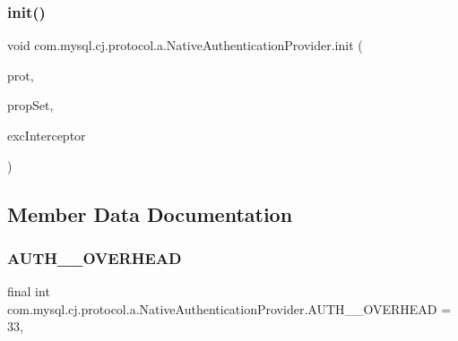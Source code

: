\subsubsection{\texorpdfstring{init()}{init()}}
{\footnotesize\ttfamily void com.\+mysql.\+cj.\+protocol.\+a.\+Native\+Authentication\+Provider.\+init (\begin{DoxyParamCaption}\item[{\mbox{\hyperlink{interfacecom_1_1mysql_1_1cj_1_1protocol_1_1_protocol}{Protocol}}$<$ \mbox{\hyperlink{classcom_1_1mysql_1_1cj_1_1protocol_1_1a_1_1_native_packet_payload}{Native\+Packet\+Payload}} $>$}]{prot,  }\item[{\mbox{\hyperlink{interfacecom_1_1mysql_1_1cj_1_1conf_1_1_property_set}{Property\+Set}}}]{prop\+Set,  }\item[{\mbox{\hyperlink{interfacecom_1_1mysql_1_1cj_1_1exceptions_1_1_exception_interceptor}{Exception\+Interceptor}}}]{exc\+Interceptor }\end{DoxyParamCaption})}



\subsection{Member Data Documentation}
\mbox{\label{classcom_1_1mysql_1_1cj_1_1protocol_1_1a_1_1_native_authentication_provider_a49df77ded491c1f4b77a3f1dddeb33a5}} 
\subsubsection{\texorpdfstring{A\+U\+T\+H\+\_\+\_\+\+O\+V\+E\+R\+H\+E\+AD}{AUTH\_411\_OVERHEAD}}
{\footnotesize\ttfamily final int com.\+mysql.\+cj.\+protocol.\+a.\+Native\+Authentication\+Provider.\+A\+U\+T\+H\+\_\+\_\+\+O\+V\+E\+R\+H\+E\+AD = 33\hspace{0.3cm}{\ttfamily [static]}, {\ttfamily [protected]}}

